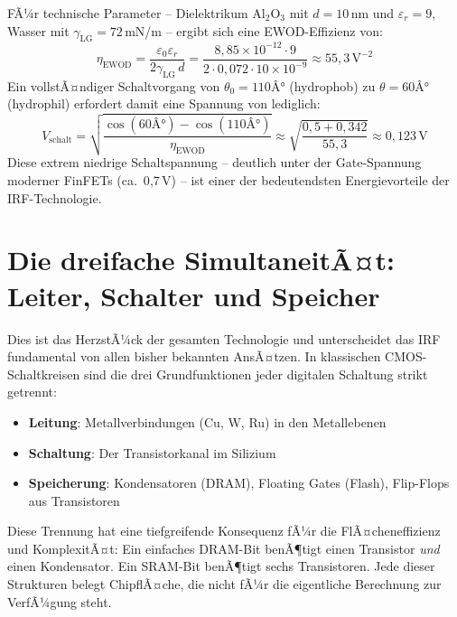 ﻿\documentclass[a4paper,12pt]{scrreprt}
\theoremstyle{definition}
\begin{document}
FÃ¼r technische Parameter -- Dielektrikum Al$_2$O$_3$ mit $d = 10$\,nm und
$\varepsilon_r = 9$, Wasser mit $\gamma_{\mathrm{LG}} = 72$\,mN/m -- ergibt sich
eine EWOD-Effizienz von:
\begin{equation}
	\eta_{\mathrm{EWOD}} = \frac{\varepsilon_0 \varepsilon_r}{2\gamma_{\mathrm{LG}}\, d}
	= \frac{8{,}85 \times 10^{-12} \cdot 9}{2 \cdot 0{,}072 \cdot 10 \times 10^{-9}}
	\approx 55{,}3\,\text{V}^{-2}
	\label{eq:ewod_effizienz}
\end{equation}
Ein vollstÃ¤ndiger Schaltvorgang von $\theta_0 = 110Â°$ (hydrophob) zu
$\theta = 60Â°$ (hydrophil) erfordert damit eine Spannung von lediglich:
\begin{equation}
	V_{\mathrm{schalt}} = \sqrt{\frac{\cos(60Â°) - \cos(110Â°)}{\eta_{\mathrm{EWOD}}}}
	\approx \sqrt{\frac{0{,}5 + 0{,}342}{55{,}3}} \approx 0{,}123\,\text{V}
	\label{eq:schaltspannung}
\end{equation}
Diese extrem niedrige Schaltspannung -- deutlich unter der Gate-Spannung
moderner FinFETs (ca.\ 0{,}7\,V) -- ist einer der bedeutendsten
Energievorteile der IRF-Technologie.

\section{Die dreifache SimultaneitÃ¤t: Leiter, Schalter und Speicher}

Dies ist das HerzstÃ¼ck der gesamten Technologie und unterscheidet das IRF
fundamental von allen bisher bekannten AnsÃ¤tzen. In klassischen
CMOS-Schaltkreisen sind die drei Grundfunktionen jeder digitalen Schaltung
strikt getrennt:

\begin{itemize}
	\item \textbf{Leitung}: Metallverbindungen (Cu, W, Ru) in den Metallebenen
	\item \textbf{Schaltung}: Der Transistorkanal im Silizium
	\item \textbf{Speicherung}: Kondensatoren (DRAM), Floating Gates (Flash),
	Flip-Flops aus Transistoren
\end{itemize}

Diese Trennung hat eine tiefgreifende Konsequenz fÃ¼r die FlÃ¤cheneffizienz und
KomplexitÃ¤t: Ein einfaches DRAM-Bit benÃ¶tigt einen Transistor \emph{und}
einen Kondensator. Ein SRAM-Bit benÃ¶tigt sechs Transistoren. Jede dieser
Strukturen belegt ChipflÃ¤che, die nicht fÃ¼r die eigentliche Berechnung
zur VerfÃ¼gung steht.
\end{document}
